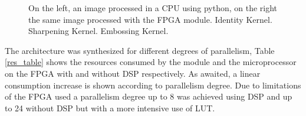 \documentclass[conference,compsoc]{IEEEtran}
\begin{document}
\begin{figure}[!t]
\centering
{}
\hfil
{}
\hfil
{}
\caption{On the left, an image processed in a CPU using python, on the right the
  same image processed with the FPGA module. \protect{}
  Identity Kernel. \protect{} Sharpening Kernel.
  \protect{} Embossing Kernel.}
\label{images_py_po}
\end{figure}

The architecture was synthesized for different degrees of parallelism, Table
\ref{res_table} shows the resources consumed by the module and the
microprocessor on the FPGA with and without DSP respectively. As awaited, a linear consumption
increase is shown according to parallelism degree. Due to limitations
of the FPGA used a parallelism degree up to 8 was achieved using DSP and up to
24 without DSP but with a more intensive use of LUT.
\end{document}
